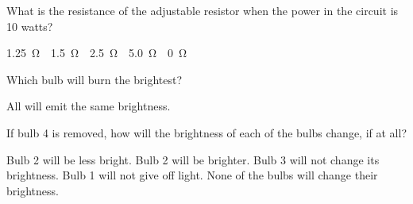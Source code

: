 \documentclass{../../oss-apphys-exam}
\begin{document}
\begin{multicols}{2}
\begin{questions}
    \question What is the resistance of the adjustable resistor when the power
    in the circuit is 10 watts?
    \label{adjust2}
    \begin{choices}
      \choice\SI{1.25}\ohm
      \choice\SI{1.5}\ohm
      \choice\SI{2.5}\ohm
      \choice\SI{5.0}\ohm
      \choice\SI{0}\ohm
    \end{choices}    
    
%
%
    
    \question Which bulb will burn the brightest?
    \label{bulb1}
    \begin{choices}
       \choice All will emit the same brightness.
    \end{choices}
    \vspace{.7in}
    
    \question If bulb 4 is removed, how will the brightness of each of the bulbs
    change, if at all?
    \label{bulb2}
    \begin{choices}
      \choice Bulb 2 will be less bright.
      \choice Bulb 2 will be brighter.
      \choice Bulb 3 will not change its brightness.
      \choice Bulb 1 will not give off light.
      \choice None of the bulbs will change their brightness.
    \end{choices}
  \end{questions}
\end{multicols}
\newpage

\end{document}
